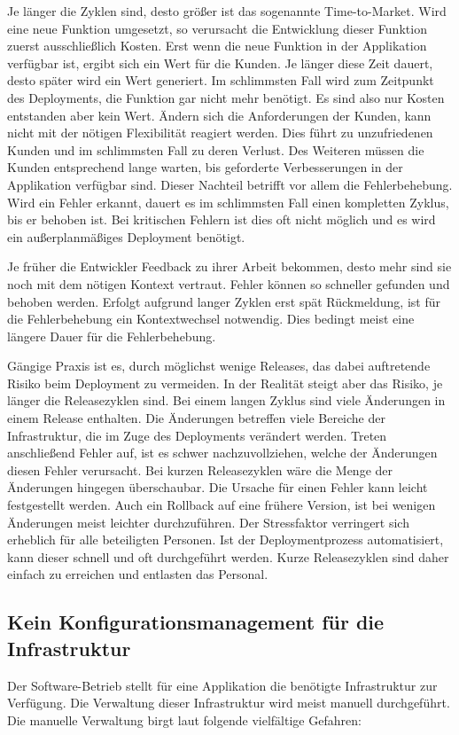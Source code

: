 Je länger die Zyklen sind, desto größer ist das sogenannte Time-to-Market. Wird eine neue Funktion umgesetzt, so verursacht die Entwicklung dieser Funktion zuerst ausschließlich Kosten. Erst wenn die neue Funktion in der Applikation verfügbar ist, ergibt sich ein Wert für die Kunden. Je länger diese Zeit dauert, desto später wird ein Wert generiert. Im schlimmsten Fall wird zum Zeitpunkt des Deployments, die Funktion gar nicht mehr benötigt. Es sind also nur Kosten entstanden aber kein Wert. Ändern sich die Anforderungen der Kunden, kann nicht mit der nötigen Flexibilität reagiert werden. Dies führt zu unzufriedenen Kunden und im schlimmsten Fall zu deren Verlust. Des Weiteren müssen die Kunden entsprechend lange warten, bis geforderte Verbesserungen in der Applikation verfügbar sind. Dieser Nachteil betrifft vor allem die Fehlerbehebung. Wird ein Fehler erkannt, dauert es im schlimmsten Fall einen kompletten Zyklus, bis er behoben ist. Bei kritischen Fehlern ist dies oft nicht möglich und es wird ein außerplanmäßiges Deployment benötigt.

Je früher die Entwickler Feedback zu ihrer Arbeit bekommen, desto mehr sind sie noch mit dem nötigen Kontext vertraut. Fehler können so schneller gefunden und behoben werden. Erfolgt aufgrund langer Zyklen erst spät Rückmeldung, ist für die Fehlerbehebung ein Kontextwechsel notwendig. Dies bedingt meist eine längere Dauer für die Fehlerbehebung.

Gängige Praxis ist es, durch möglichst wenige Releases, das dabei auftretende Risiko beim Deployment zu vermeiden. In der Realität steigt aber das Risiko, je länger die Releasezyklen sind. Bei einem langen Zyklus sind viele Änderungen in einem Release enthalten. Die Änderungen betreffen viele Bereiche der Infrastruktur, die im Zuge des Deployments verändert werden. Treten anschließend Fehler auf, ist es schwer nachzuvollziehen, welche der Änderungen diesen Fehler verursacht. Bei kurzen Releasezyklen wäre die Menge der Änderungen hingegen überschaubar. Die Ursache für einen Fehler kann leicht festgestellt werden. Auch ein Rollback auf eine frühere Version, ist bei wenigen Änderungen meist leichter durchzuführen. Der Stressfaktor verringert sich erheblich für alle beteiligten Personen. Ist der Deploymentprozess automatisiert, kann dieser schnell und oft durchgeführt werden. Kurze Releasezyklen sind daher einfach zu erreichen und entlasten das Personal.

\subsection{Kein Konfigurationsmanagement für die Infrastruktur}
\label{sec:probleme:infrastruktur}
Der Software-Betrieb stellt für eine Applikation die benötigte Infrastruktur zur Verfügung. Die Verwaltung dieser Infrastruktur wird meist manuell durchgeführt. Die manuelle Verwaltung birgt laut \cite{humble2010} folgende vielfältige Gefahren:

